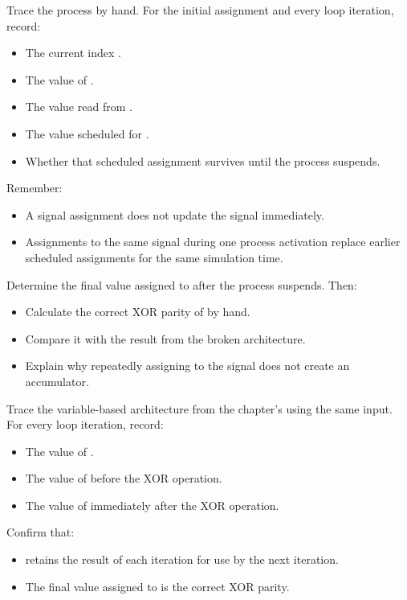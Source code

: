 \begin{parts}
  \item Trace the process by hand. For the initial assignment and every loop iteration, record:
    \begin{itemize}
      \item The current index .
      \item The value of .
      \item The value read from .
      \item The value scheduled for .
      \item Whether that scheduled assignment survives until the process suspends.
    \end{itemize}
    Remember:
    \begin{itemize}
      \item A signal assignment does not update the signal immediately.
      \item Assignments to the same signal during one process activation replace earlier scheduled
        assignments for the same simulation time.
    \end{itemize}
  \item Determine the final value assigned to  after the process suspends. Then:
    \begin{itemize}
      \item Calculate the correct XOR parity of  by hand.
      \item Compare it with the result from the broken architecture.
      \item Explain why repeatedly assigning to the signal does not create an accumulator.
    \end{itemize}
  \item Trace the variable-based  architecture from the chapter's
     using the same input. For every loop iteration, record:
    \begin{itemize}
      \item The value of .
      \item The value of  before the XOR operation.
      \item The value of  immediately after the XOR operation.
    \end{itemize}
    Confirm that:
    \begin{itemize}
      \item {} retains the result of each iteration for use by the next iteration.
      \item The final value assigned to  is the correct XOR parity.
    \end{itemize}
\end{parts}

